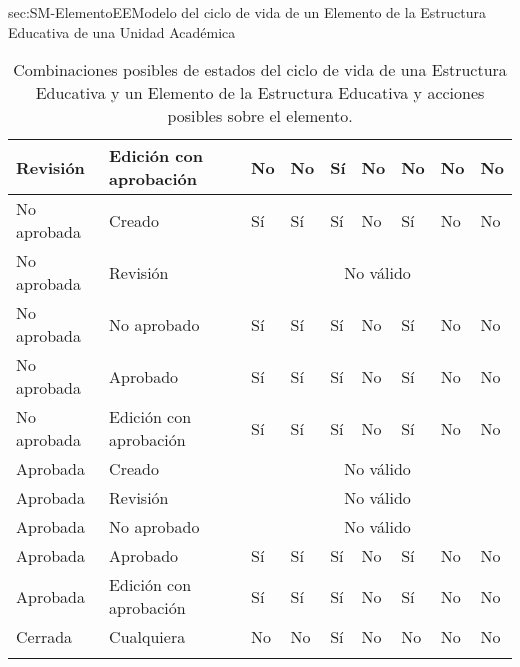 \begin{Maquina}{sec:SM-ElementoEE}{Modelo del ciclo de vida de un Elemento de la Estructura Educativa de una Unidad Académica}
\begin{longtable}{| p{} | p{} | p{}| p{}| p{}| p{}| p{}| p{}| p{}| }
	\hline
	Revisión & Edición con aprobación & No & No & Sí & No & No & No & No\\
	\hline
	No aprobada & Creado & Sí & Sí & Sí & No & Sí & No & No\\
	\hline
	No aprobada & Revisión & \multicolumn{7}{c|}{No válido}\\
	\hline
	No aprobada & No aprobado & Sí & Sí & Sí & No & Sí & No & No\\
	\hline
	No aprobada & Aprobado & Sí & Sí & Sí & No & Sí & No & No\\
	\hline
	No aprobada & Edición con aprobación & Sí & Sí & Sí & No & Sí & No & No\\
	\hline
	Aprobada & Creado & \multicolumn{7}{c|}{No válido}\\
	\hline
	Aprobada & Revisión & \multicolumn{7}{c|}{No válido}\\
	\hline
	Aprobada & No aprobado & \multicolumn{7}{c|}{No válido}\\
	\hline
	Aprobada & Aprobado & Sí & Sí & Sí & No & Sí & No & No\\
	\hline
	Aprobada & Edición con aprobación & Sí & Sí & Sí & No & Sí & No & No\\
	\hline
	Cerrada & Cualquiera & No & No & Sí & No & No & No & No\\
	\hline
	\caption{Combinaciones posibles de estados del ciclo de vida de una Estructura Educativa y un Elemento de la Estructura Educativa y acciones posibles sobre el elemento.}
\end{longtable}

\end{Maquina}